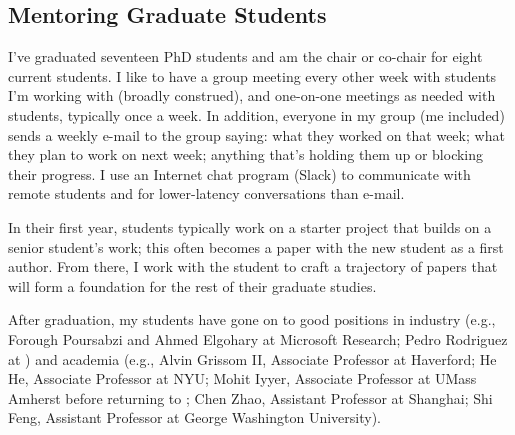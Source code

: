 \subsection{Mentoring Graduate Students}

I've graduated seventeen PhD students and am the chair or co-chair for
eight current students.  I like to have a group meeting every other
week with students I'm working with (broadly construed), and
one-on-one meetings as needed with students, typically once a week. In
addition, everyone in my group (me included) sends a weekly e-mail to
the group saying: what they worked on that week; what they plan to work
on next week; anything that's holding them up or blocking their
progress. I use an Internet chat program (Slack) to communicate with remote
students and for lower-latency conversations than e-mail.

In their first year, students typically work on a starter project that
builds on a senior student's work; this often becomes a paper with the
new student as a first author.  From there, I work with the student to
craft a trajectory of papers that will form a foundation for the rest
of their graduate studies.

After graduation, my students have gone on to good positions in
industry (e.g., Forough Poursabzi and Ahmed Elgohary at Microsoft
Research; Pedro Rodriguez at ) and academia (e.g., Alvin
Grissom II, Associate Professor at Haverford; He He, Associate
Professor at NYU; Mohit Iyyer, Associate Professor at UMass Amherst
before returning to ;
Chen Zhao, Assistant Professor at  Shanghai;
Shi Feng, Assistant Professor at George Washington University).






